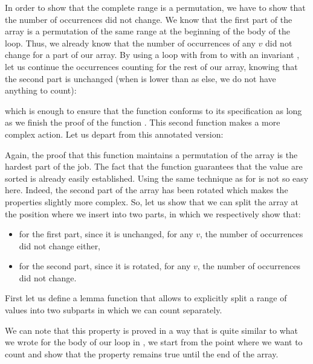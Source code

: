 In order to show that the complete range is a permutation, we have to show that
the number of occurrences did not change. We know that the first part of the
array is a permutation of the same range at the beginning of the body of the loop.
Thus, we already know that the number of occurrences of any $v$ did not change
for a part of our array. By using a loop with  from 
to  with an invariant ,
let us continue the occurrences counting for the rest of our array, knowing that
the second part is unchanged (when  is lower than 
as else, we do not have anything to count):




which is enough to ensure that the  function
conforms to its specification as long as we finish the proof of the function
. This second function makes a more complex action. Let us
depart from this annotated version:




Again, the proof that this function maintains a permutation of the array is
the hardest part of the job. The fact that the function guarantees that the
value are sorted is already easily established. Using the same technique as
for  is not so easy here. Indeed, the second part
of the array has been rotated which makes the properties slightly more
complex. So, let us show that we can split the array at the position where
we insert into two parts, in which we respectively show that:

\begin{itemize}
\item for the first part, since it is unchanged, for any $v$, the number of
  occurrences did not change either,
\item for the second part, since it is rotated, for any $v$, the number of
  occurrences did not change.
\end{itemize}

First let us define a lemma function that allows to explicitly split a range of
values into two subparts in which we can count separately.




We can note that this property is proved in a way that is quite similar to what
we wrote for the body of our loop in , we start from
the point where we want to count and show that the property remains true until
the end of the array.



